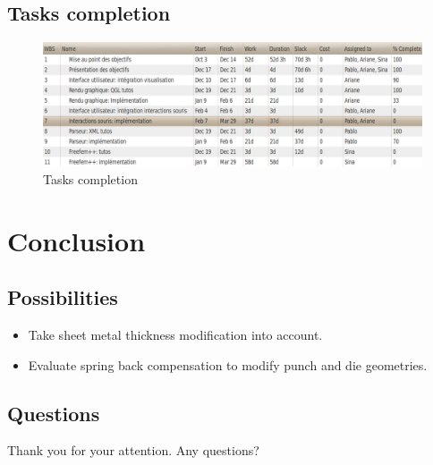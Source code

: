 \documentclass{beamer}
\begin{document}
\subsection{Tasks completion}
\begin{frame}
    \begin{figure}
        \includegraphics[width=\textwidth]{img/ganttCompletionTasks.png}
        \caption{Tasks completion}
        \label{Complétion}
    \end{figure}
\end{frame}

\section{Conclusion}
\subsection{Possibilities}
\begin{frame}
    \begin{itemize}
        \item Take sheet metal thickness modification into account.
        \item Evaluate spring back compensation to modify punch and die geometries.
    \end{itemize}
\end{frame}
\subsection{Questions}
\begin{frame}
    Thank you for your attention.
    \hfill Any questions?
\end{frame}
\end{document}
